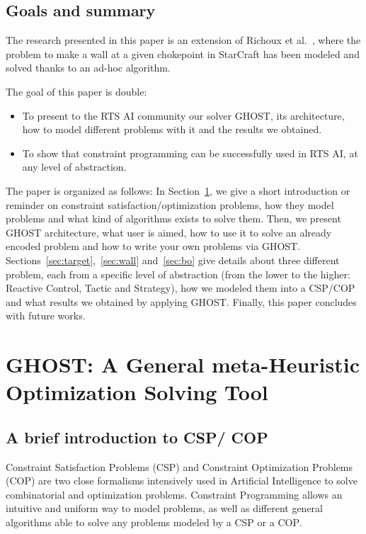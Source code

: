 \documentclass{article}
\newcommand{\csp}{\textsc{CSP}\xspace}
\newcommand{\cop}{\textsc{COP}\xspace}
\newcommand{\ghost}{\textsc{GHOST}\xspace}
\begin{document}
\subsection{Goals and summary}

The research  presented in this  paper is  an extension of  Richoux et
al.~\cite{RichouxUO14}, where  the problem to  make a wall at  a given
chokepoint  in StarCraft  has been  modeled  and solved  thanks to  an
ad-hoc algorithm.

The goal of this paper is double:
\begin{itemize}
\item  To present  to  the RTS  AI community  our  solver \ghost,  its
  architecture,  how  to model  different  problems  with it  and  the
  results we obtained.
\item To show that constraint  programming can be successfully used in
  RTS AI, at any level of abstraction.
\end{itemize}

The paper is organized as follows: In Section~\ref{sec:ghost}, we give
a     short     introduction     or     reminder     on     constraint
satisfaction/optimization problems,  how they model problems  and what
kind  of algorithms  exists to  solve them.   Then, we  present \ghost
architecture, what  user is aimed, how  to use it to  solve an already
encoded  problem  and how  to  write  your  own problems  via  \ghost.
Sections~\ref{sec:target},~\ref{sec:wall}     and~\ref{sec:bo}    give
details about three  different problem, each from a  specific level of
abstraction (from  the lower to  the higher: Reactive  Control, Tactic
and Strategy), how  we modeled them into a \csp/\cop  and what results
we obtained  by applying  \ghost. Finally,  this paper  concludes with
future works.

\section{\ghost:   A  General   meta-Heuristic  Optimization   Solving
  Tool}\label{sec:ghost}
\subsection{A brief introduction to \csp / \cop}

Constraint  Satisfaction Problems  (\csp) and  Constraint Optimization
Problems  (\cop)   are  two  close  formalisms   intensively  used  in
Artificial  Intelligence  to   solve  combinatorial  and  optimization
problems. Constraint  Programming allows an intuitive  and uniform way
to model  problems, as  well as different  general algorithms  able to
solve any problems modeled by a \csp or a \cop.
\end{document}
